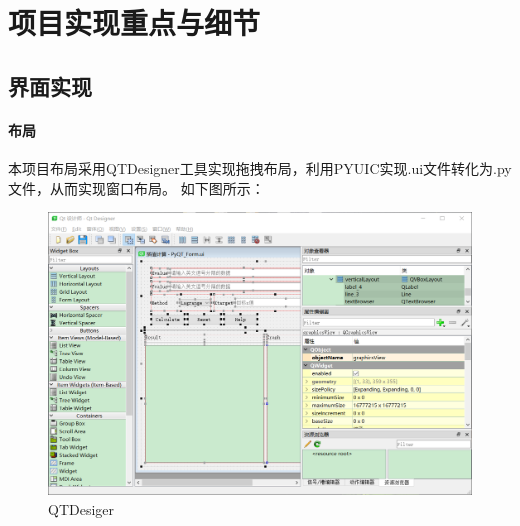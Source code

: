 \documentclass[UTF8]{ctexart}
\begin{document}
    \section{项目实现重点与细节}
        \subsection{界面实现}
            \paragraph{布局}
            本项目布局采用QTDesigner工具实现拖拽布局，利用PYUIC实现.ui文件转化为.py文件，从而实现窗口布局。
            如下图所示：
            \begin{figure}[htb]
                \centering
                \includegraphics[scale = 0.4]{QTDesigner.png}
                \caption{QTDesiger}
                \label{fig:designer}
            \end{figure}
\end{document}
